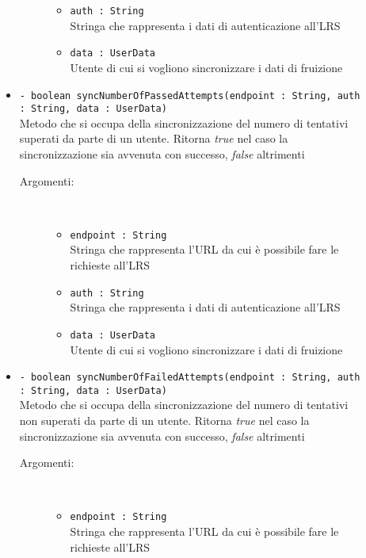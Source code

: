 \documentclass[../Tesi.tex]{subfiles}
\begin{document}
\begin{description}
\begin{itemize}
\begin{description}
\begin{itemize}
						\item \texttt{auth : String}\\
						Stringa che rappresenta i dati di autenticazione all'LRS

						\item \texttt{data : UserData}\\
						Utente di cui si vogliono sincronizzare i dati di fruizione
					\end{itemize}
				\end{description}

				\item \texttt{- boolean syncNumberOfPassedAttempts(endpoint : String, auth : String, data : UserData)}\\
				Metodo che si occupa della sincronizzazione del numero di tentativi superati da parte di un utente. Ritorna \textit{true} nel caso la sincronizzazione sia avvenuta con successo, \textit{false} altrimenti
				\begin{description}
					\item[Argomenti:] \
					\begin{itemize}
						\item \texttt{endpoint : String}\\
						Stringa che rappresenta l'URL da cui è possibile fare le richieste all'LRS

						\item \texttt{auth : String}\\
						Stringa che rappresenta i dati di autenticazione all'LRS

						\item \texttt{data : UserData}\\
						Utente di cui si vogliono sincronizzare i dati di fruizione
					\end{itemize}
				\end{description}

				\item \texttt{- boolean syncNumberOfFailedAttempts(endpoint : String, auth : String, data : UserData)}\\
				Metodo che si occupa della sincronizzazione del numero di tentativi non superati da parte di un utente. Ritorna \textit{true} nel caso la sincronizzazione sia avvenuta con successo, \textit{false} altrimenti
				\begin{description}
					\item[Argomenti:] \
					\begin{itemize}
						\item \texttt{endpoint : String}\\
						Stringa che rappresenta l'URL da cui è possibile fare le richieste all'LRS


\end{itemize}
\end{description}
\end{itemize}
\end{description}
\end{document}
